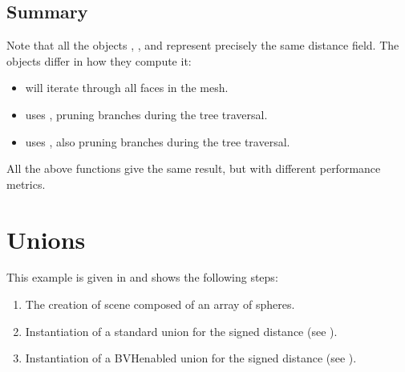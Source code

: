 \documentclass[letterpaper,10pt,english]{sphinxmanual}
\begin{document}
\begin{sphinxVerbatim}[commandchars=\\\{\}]

\end{sphinxVerbatim}


\subsection{Summary}
\label{\detokenize{Example_Basic:summary}}
\sphinxAtStartPar
Note that all the objects , , and  represent precisely the same distance field.
The objects differ in how they compute it:
\begin{itemize}
\item {} 
\sphinxAtStartPar
{} will iterate through all faces in the mesh.

\item {} 
\sphinxAtStartPar
{} uses , pruning branches during the tree traversal.

\item {} 
\sphinxAtStartPar
{} uses , also pruning branches during the tree traversal.

\end{itemize}

\sphinxAtStartPar
All the above functions give the same result, but with different performance metrics.

\sphinxstepscope


\section{Unions}
\label{\detokenize{Example_Union:unions}}\label{\detokenize{Example_Union:chap-exampleunion}}\label{\detokenize{Example_Union::doc}}
\sphinxAtStartPar
This example is given in  and shows the following steps:
\begin{enumerate}
%
\item {} 
\sphinxAtStartPar
The creation of scene composed of an array of spheres.

\item {} 
\sphinxAtStartPar
Instantiation of a standard union for the signed distance (see {\hyperref[\detokenize{ImplemUnion:chap-union}]{}}).

\item {} 
\sphinxAtStartPar
Instantiation of a BVH\sphinxhyphen{}enabled union for the signed distance (see {\hyperref[\detokenize{ImplemUnion:chap-union}]{}}).

\end{enumerate}
\end{document}
